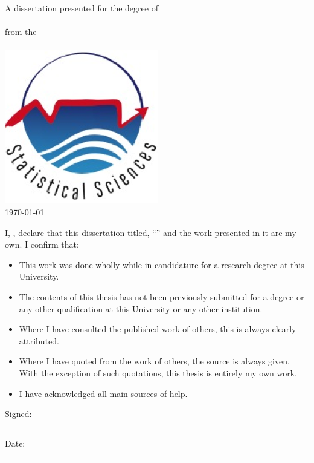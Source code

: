 \documentclass[
12pt, %
english, %
singlespacing, %
liststotoc, %
parskip, %
headsepline, %
openany,
]{MastersDoctoralThesis} %
\numberwithin{theorem}{section}
\numberwithin{remark}{section}
\numberwithin{assumption}{section}
\begin{document}
\begin{titlepage}
\begin{center}
\large {A dissertation presented for the degree of \\ \degreename \ }\\[0.3cm] %
{from the}\\[0.4cm]
\deptname\\[1cm] %
\includegraphics*[width=0.25\linewidth]{Figures/statslogo.png} \\[1cm]
{\large \today}\\[4cm] %
 
\vfill
\end{center}
\end{titlepage}



\begin{declaration}
\addchaptertocentry{\authorshipname} 
\vspace{1.5cm}

\noindent I, \authorname, declare that this dissertation titled, \enquote{\ttitle} and the work presented in it are my own. I confirm that:

\begin{itemize} 
\item This work was done wholly while in candidature for a research degree at this University.
\item The contents of this thesis has not been previously submitted for a degree or any other qualification at this University or any other institution.
\item Where I have consulted the published work of others, this is always clearly attributed.
\item Where I have quoted from the work of others, the source is always given. With the exception of such quotations, this thesis is entirely my own work.
\item I have acknowledged all main sources of help.
\end{itemize}

\vspace{1cm}
\noindent Signed:\\
\rule[0.5em]{25em}{0.5pt} %
	
\noindent Date:\\
\rule[0.5em]{25em}{0.5pt} %
\end{declaration}
\end{document}
